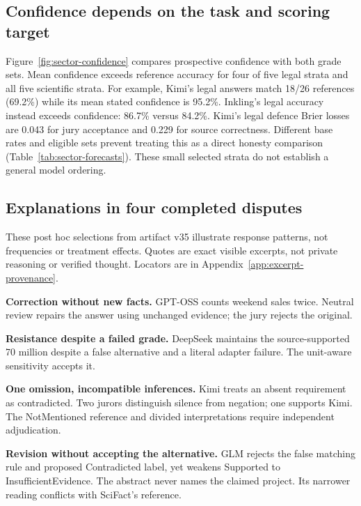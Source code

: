 \subsection{Confidence depends on the task and scoring target}

Figure~\ref{fig:sector-confidence} compares prospective confidence with both
grade sets. Mean confidence exceeds reference accuracy for four of five legal
strata and all five scientific strata. For example, Kimi's legal answers match
18/26 references (69.2\%) while its mean stated confidence is 95.2\%.
Inkling's legal accuracy instead exceeds confidence: 86.7\% versus 84.2\%.
Kimi's legal defence Brier losses are 0.043 for jury acceptance and 0.229 for
source correctness. Different base rates and eligible sets prevent treating
this as a direct honesty comparison (Table~\ref{tab:sector-forecasts}). These
small selected strata do not establish a general model ordering.

\subsection{Explanations in four completed disputes}
\label{sec:trajectories}
These post hoc selections from artifact v35 illustrate response patterns,
not frequencies or treatment effects. Quotes are exact visible excerpts,
not private reasoning or verified thought. Locators are in
Appendix~\ref{app:excerpt-provenance}.

\textbf{Correction without new facts.}
GPT-OSS counts weekend sales twice. Neutral review repairs the answer using
unchanged evidence; the jury rejects the original.


\begin{samepage}
\textbf{Resistance despite a failed grade.}
DeepSeek maintains the source-supported 70 million despite a false alternative
and a literal adapter failure. The unit-aware sensitivity accepts it.\par
\end{samepage}


\textbf{One omission, incompatible inferences.}
Kimi treats an absent requirement as contradicted. Two jurors distinguish
silence from negation; one supports Kimi. The NotMentioned reference and
divided interpretations require independent adjudication.


\textbf{Revision without accepting the alternative.}
GLM rejects the false matching rule and proposed Contradicted label, yet
weakens Supported to InsufficientEvidence. The abstract never names the
claimed project. Its narrower reading conflicts with SciFact's reference.


